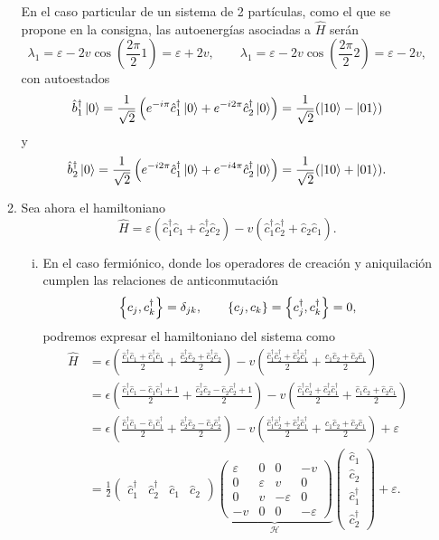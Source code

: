 \documentclass{scrartcl}
\newcommand{\inv}[1]{\frac{1}{#1}}
\renewcommand{\b}{\hat{b}}
\renewcommand{\c}{\hat{c}}
\DeclareRobustCommand{\[}{\begin{equation}}
\DeclareRobustCommand{\]}{\end{equation}}
\begin{document}
\begin{enumerate}
\begin{enumerate}
        En el caso particular de un sistema de 2 partículas, como el que se propone en la consigna, las autoenergías asociadas a $\hat H$ serán
        \[ \lambda_1 = \varepsilon - 2v \cos(\frac{2\pi}{2} 1) = \varepsilon + 2 v, \quad \quad \lambda_1 = \varepsilon - 2v \cos(\frac{2\pi}{2} 2) = \varepsilon - 2 v, \]
        con autoestados
        \[ \b_1^\dagger \ket{0} = \inv{\sqrt{2}} \left( e^{-i \pi} \c_1^\dagger \ket{0} + e^{-i 2\pi} \c_2^\dagger \ket{0} \right) = \inv{\sqrt{2}} (\ket{10} - \ket{01}) \]
        y
        \[ \b_2^\dagger \ket{0} = \inv{\sqrt{2}} \left( e^{-i 2\pi} \c_1^\dagger \ket{0} + e^{-i 4\pi} \c_2^\dagger \ket{0} \right) = \inv{\sqrt{2}} (\ket{10} + \ket{01}). \]
        
        
        \item Sea ahora el hamiltoniano
        \[ \hat H = \varepsilon (\c_1^\dagger \c_1 + \c_2^\dagger \c_2) - v (\c_1^\dagger \c_2^\dagger + \c_2 \c_1). \]
        \begin{enumerate}[(i)]
            \item En el caso fermiónico, donde los operadores de creación y aniquilación cumplen las relaciones de anticonmutación
            \[ \acomm{c_j}{c_k^\dagger} = \delta_{jk}, \quad\quad \acomm{c_j}{c_k} = \acomm{c_j^\dagger}{c_k^\dagger} = 0, \]
            podremos expresar el hamiltoniano del sistema como
            \begin{align}
                \hat H &= \epsilon \left( \frac{\c_1^\dagger \c_1 + \c_1^\dagger \c_1}{2} + \frac{\c_2^\dagger \c_2 + \c_2^\dagger \c_2}{2} \right) - v \left( \frac{\c_1^\dagger \c_2^\dagger + \c_2^\dagger \c_1^\dagger}{2} + \frac{\c_1 \c_2 + \c_2 \c_1}{2} \right) \\
                    &= \epsilon \left( \frac{\c_1^\dagger \c_1 - \c_1 \c_1^\dagger + 1}{2} + \frac{\c_2^\dagger \c_2 - \c_2 \c_2^\dagger + 1}{2} \right) - v \left( \frac{\c_1^\dagger \c_2^\dagger + \c_2^\dagger \c_1^\dagger}{2} + \frac{\c_1 \c_2 + \c_2 \c_1}{2} \right) \\
                    &= \epsilon \left( \frac{\c_1^\dagger \c_1 - \c_1 \c_1^\dagger}{2} + \frac{\c_2^\dagger \c_2 - \c_2 \c_2^\dagger}{2} \right) - v \left( \frac{\c_1^\dagger \c_2^\dagger + \c_2^\dagger \c_1^\dagger}{2} + \frac{\c_1 \c_2 + \c_2 \c_1}{2} \right) + \varepsilon \\
                    &= \inv{2} \begin{pmatrix} \c_1^\dagger & \c_2^\dagger & \c_1 & \c_2 \end{pmatrix} \underbrace{\begin{pmatrix} \varepsilon & 0 & 0 & -v \\ 0 & \varepsilon & v & 0 \\ 0 & v & -\varepsilon & 0 \\ -v & 0 & 0 & -\varepsilon \end{pmatrix}}_{\mathcal{H}} \begin{pmatrix} \c_1 \\ \c_2 \\ \c_1^\dagger \\ \c_2^\dagger \end{pmatrix} + \varepsilon.

\end{align}
\end{enumerate}
\end{enumerate}
\end{enumerate}
\end{document}
